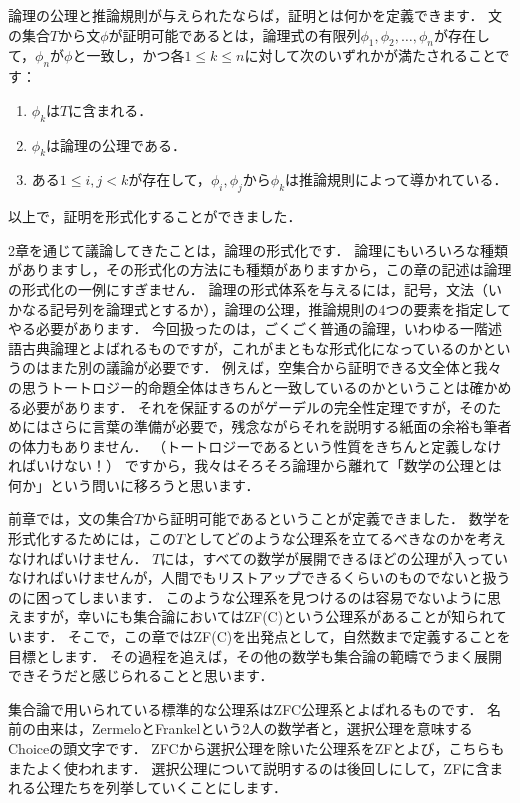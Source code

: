 \documentclass[./main]{subfiles}
\begin{document}
論理の公理と推論規則が与えられたならば，証明とは何かを定義できます．
文の集合$T$から文$\phi$が証明可能であるとは，論理式の有限列$\phi_1,\phi_2,\ldots,\phi_n$が存在して，$\phi_n$が$\phi$と一致し，かつ各$1\leq k\leq n$に対して次のいずれかが満たされることです：
\begin{enumerate}
\item $\phi_k$は$T$に含まれる．
\item $\phi_k$は論理の公理である．
\item ある$1\leq i, j <k$が存在して，$\phi_i, \phi_j$から$\phi_k$は推論規則によって導かれている．
\end{enumerate}
以上で，証明を形式化することができました．

2章を通じて議論してきたことは，論理の形式化です．
論理にもいろいろな種類がありますし，その形式化の方法にも種類がありますから，この章の記述は論理の形式化の一例にすぎません．
論理の形式体系を与えるには，記号，文法（いかなる記号列を論理式とするか），論理の公理，推論規則の4つの要素を指定してやる必要があります．
今回扱ったのは，ごくごく普通の論理，いわゆる一階述語古典論理とよばれるものですが，これがまともな形式化になっているのかというのはまた別の議論が必要です．
例えば，空集合から証明できる文全体と我々の思うトートロジー的命題全体はきちんと一致しているのかということは確かめる必要があります．
それを保証するのがゲーデルの完全性定理ですが，そのためにはさらに言葉の準備が必要で，残念ながらそれを説明する紙面の余裕も筆者の体力もありません．
（トートロジーであるという性質をきちんと定義しなければいけない！）
ですから，我々はそろそろ論理から離れて「数学の公理とは何か」という問いに移ろうと思います．


前章では，文の集合$T$から証明可能であるということが定義できました．
数学を形式化するためには，この$T$としてどのような公理系を立てるべきなのかを考えなければいけません．
$T$には，すべての数学が展開できるほどの公理が入っていなければいけませんが，人間でもリストアップできるくらいのものでないと扱うのに困ってしまいます．
このような公理系を見つけるのは容易でないように思えますが，幸いにも集合論においてはZF(C)という公理系があることが知られています．
そこで，この章ではZF(C)を出発点として，自然数まで定義することを目標とします．
その過程を追えば，その他の数学も集合論の範疇でうまく展開できそうだと感じられることと思います．


集合論で用いられている標準的な公理系はZFC公理系とよばれるものです．
名前の由来は，ZermeloとFrankelという2人の数学者と，選択公理を意味するChoiceの頭文字です．
ZFCから選択公理を除いた公理系をZFとよび，こちらもまたよく使われます．
選択公理について説明するのは後回しにして，ZFに含まれる公理たちを列挙していくことにします．
\end{document}
